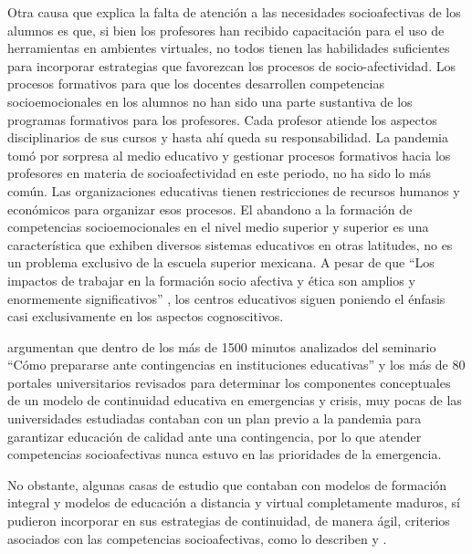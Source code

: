 \documentclass[spanish]{textolivre}
\begin{document}
Otra causa que explica la falta de atención a las necesidades socioafectivas de los alumnos es que, si bien los profesores han recibido capacitación para el uso de herramientas en ambientes virtuales, no todos tienen las habilidades suficientes para incorporar estrategias que favorezcan los procesos de socio-afectividad. Los procesos formativos para que los docentes desarrollen competencias socioemocionales en los alumnos no han sido una parte sustantiva de los programas formativos para los profesores. Cada profesor atiende los aspectos disciplinarios de sus cursos y hasta ahí queda su responsabilidad. La pandemia tomó por sorpresa al medio educativo y gestionar procesos formativos hacia los profesores en materia de socioafectividad en este periodo, no ha sido lo más común.  Las organizaciones educativas tienen restricciones de recursos humanos y económicos para organizar esos procesos. 
El abandono a la formación de competencias socioemocionales en el nivel medio superior y superior es una característica que exhiben diversos sistemas educativos en otras latitudes, no es un problema exclusivo de la escuela superior mexicana. A pesar de que “Los impactos de trabajar en la formación socio afectiva y ética son amplios y enormemente significativos” \cite[p. 19]{romagnoli2007}, los centros educativos siguen poniendo el énfasis casi exclusivamente en los aspectos cognoscitivos. 

\textcite{escuderohanon-ramirez2021} argumentan que dentro de los más de 1500 minutos analizados del seminario “Cómo prepararse ante contingencias en instituciones educativas” y los más de 80 portales universitarios revisados para determinar los componentes conceptuales de un modelo de continuidad educativa en emergencias y crisis, muy pocas de las universidades estudiadas contaban con un plan previo a la pandemia para garantizar educación de calidad ante una contingencia, por lo que atender competencias socioafectivas nunca estuvo en las prioridades de la emergencia.

No obstante, algunas casas de estudio que contaban con modelos de formación integral y modelos de educación a distancia y virtual completamente maduros, sí pudieron incorporar en sus estrategias de continuidad, de manera ágil, criterios asociados con las competencias socioafectivas, como lo describen \textcite{guerra2020} y \textcite{deurquijo2020}.
\end{document}
